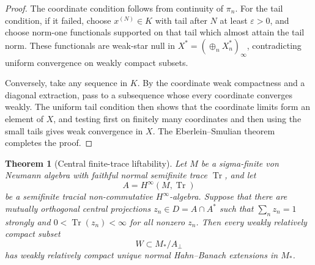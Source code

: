 \documentclass[11pt]{article}
\newtheorem{theorem}{Theorem}
\begin{document}
\begin{proof}
The coordinate condition follows from continuity of \(\pi_n\).  For the tail
condition, if it failed, choose \(x^{(N)}\in K\) with tail after \(N\) at least
\(\varepsilon>0\), and choose norm-one functionals supported on that tail
which almost attain the tail norm.  These functionals are weak-star null in
\(X^\ast=(\oplus_n X_n^\ast)_\infty\), contradicting uniform convergence on
weakly compact subsets.

Conversely, take any sequence in \(K\).  By the coordinate weak compactness
and a diagonal extraction, pass to a subsequence whose every coordinate
converges weakly.  The uniform tail condition then shows that the coordinate
limits form an element of \(X\), and testing first on finitely many coordinates
and then using the small tails gives weak convergence in \(X\).  The
Eberlein--Smulian theorem completes the proof.
\end{proof}

\begin{theorem}[Central finite-trace liftability]
Let \(M\) be a sigma-finite von Neumann algebra with faithful normal
semifinite trace \(\operatorname{Tr}\), and let
\[
A=H^\infty(M,\operatorname{Tr})
\]
be a semifinite tracial non-commutative \(H^\infty\)-algebra.  Suppose that
there are mutually orthogonal central projections \(z_n\in D=A\cap A^\ast\)
such that \(\sum_n z_n=1\) strongly and \(0<\operatorname{Tr}(z_n)<\infty\)
for all nonzero \(z_n\).  Then every weakly relatively compact subset
\[
W\subset M_\ast/A_\perp
\]
has weakly relatively compact unique normal Hahn--Banach extensions in
\(M_\ast\).
\end{theorem}
\end{document}
